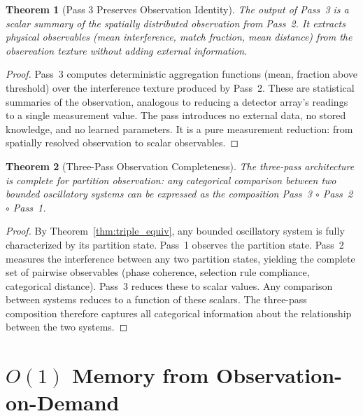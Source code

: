\documentclass[11pt,twocolumn,a4paper]{article}
\newtheorem{theorem}{Theorem}[section]
\theoremstyle{definition}
\theoremstyle{remark}
\begin{document}
\begin{theorem}[Pass 3 Preserves Observation Identity]
\label{thm:pass3_identity}
The output of Pass~3 is a scalar summary of the spatially distributed observation from Pass~2. It extracts physical observables (mean interference, match fraction, mean distance) from the observation texture without adding external information.
\end{theorem}

\begin{proof}
Pass~3 computes deterministic aggregation functions (mean, fraction above threshold) over the interference texture produced by Pass~2. These are statistical summaries of the observation, analogous to reducing a detector array's readings to a single measurement value. The pass introduces no external data, no stored knowledge, and no learned parameters. It is a pure measurement reduction: from spatially resolved observation to scalar observables.
\end{proof}

\begin{theorem}[Three-Pass Observation Completeness]
\label{thm:three_pass_complete}
The three-pass architecture is complete for partition observation: any categorical comparison between two bounded oscillatory systems can be expressed as the composition Pass~3 $\circ$ Pass~2 $\circ$ Pass~1.
\end{theorem}

\begin{proof}
By Theorem~\ref{thm:triple_equiv}, any bounded oscillatory system is fully characterized by its partition state. Pass~1 observes the partition state. Pass~2 measures the interference between any two partition states, yielding the complete set of pairwise observables (phase coherence, selection rule compliance, categorical distance). Pass~3 reduces these to scalar values. Any comparison between systems reduces to a function of these scalars. The three-pass composition therefore captures all categorical information about the relationship between the two systems.
\end{proof}


\section{$O(1)$ Memory from Observation-on-Demand}
\label{sec:o1_memory}
\end{document}
